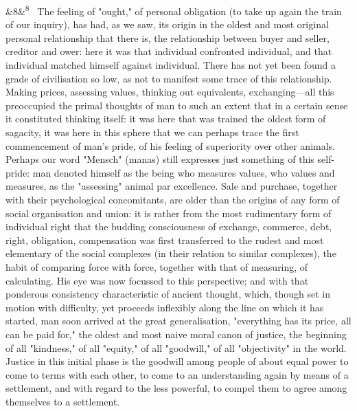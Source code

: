 \documentclass[12pt]{article}
\newcommand{\para}[1][]{\par\noindent\ifx&#1&\else\textsuperscript{\footnotesize #1}~\fi}
\begin{document}
\para[8] The feeling of "ought," of personal obligation (to take up again the train of our inquiry), has had, as we saw, its origin in the oldest and most original personal relationship that there is, the relationship between buyer and seller, creditor and ower: here it was that individual confronted individual, and that individual matched himself against individual. There has not yet been found a grade of civilisation so low, as not to manifest some trace of this relationship. Making prices, assessing values, thinking out equivalents, exchanging---all this preoccupied the primal thoughts of man to such an extent that in a certain sense it constituted thinking itself: it was here that was trained the oldest form of sagacity, it was here in this sphere that we can perhaps trace the first commencement of man's pride, of his feeling of superiority over other animals. Perhaps our word "Mensch" (manas) still expresses just something of this self-pride: man denoted himself as the being who measures values, who values and measures, as the "assessing" animal par excellence. Sale and purchase, together with their psychological concomitants, are older than the origins of any form of social organisation and union: it is rather from the most rudimentary form of individual right that the budding consciousness of exchange, commerce, debt, right, obligation, compensation was first transferred to the rudest and most elementary of the social complexes (in their relation to similar complexes), the habit of comparing force with force, together with that of measuring, of calculating. His eye was now focussed to this perspective; and with that ponderous consistency characteristic of ancient thought, which, though set in motion with difficulty, yet proceeds inflexibly along the line on which it has started, man soon arrived at the great generalisation, "everything has its price, all can be paid for," the oldest and most naive moral canon of justice, the beginning of all "kindness," of all "equity," of all "goodwill," of all "objectivity" in the world. Justice in this initial phase is the goodwill among people of about equal power to come to terms with each other, to come to an understanding again by means of a settlement, and with regard to the less powerful, to compel them to agree among themselves to a settlement.
\end{document}
